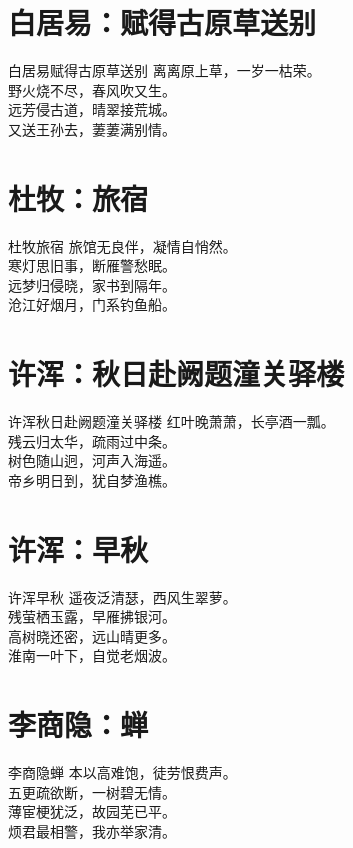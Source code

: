 \documentclass[12pt,oneside,a5paper]{book}
\begin{document}
\chapter{白居易：赋得古原草送别}
\begin{poemzh}{白居易}{赋得古原草送别}
离离原上草，一岁一枯荣。\\
野火烧不尽，春风吹又生。\\
远芳侵古道，晴翠接荒城。\\
又送王孙去，萋萋满别情。\\ 
\end{poemzh}

\chapter{杜牧：旅宿}
\begin{poemzh}{杜牧}{旅宿}
旅馆无良伴，凝情自悄然。\\
寒灯思旧事，断雁警愁眠。\\
远梦归侵晓，家书到隔年。\\
沧江好烟月，门系钓鱼船。\\ 
\end{poemzh}

\chapter{许浑：秋日赴阙题潼关驿楼}
\begin{poemzh}{许浑}{秋日赴阙题潼关驿楼}
红叶晚萧萧，长亭酒一瓢。\\
残云归太华，疏雨过中条。\\
树色随山迥，河声入海遥。\\
帝乡明日到，犹自梦渔樵。\\ 
\end{poemzh}

\chapter{许浑：早秋}
\begin{poemzh}{许浑}{早秋}
遥夜泛清瑟，西风生翠萝。\\
残萤栖玉露，早雁拂银河。\\
高树晓还密，远山晴更多。\\
淮南一叶下，自觉老烟波。\\ 
\end{poemzh}

\chapter{李商隐：蝉}
\begin{poemzh}{李商隐}{蝉}
本以高难饱，徒劳恨费声。\\
五更疏欲断，一树碧无情。\\
薄宦梗犹泛，故园芜已平。\\
烦君最相警，我亦举家清。\\ 
\end{poemzh}
\end{document}
